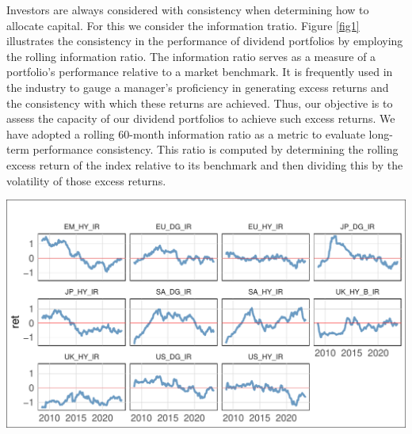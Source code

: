 \documentclass[10pt,preprint, authoryear]{elsarticle}
\let\origfigure\figure
\let\endorigfigure\endfigure
\renewenvironment{figure}[1][2] {
    \expandafter\origfigure\expandafter[H]
} {
    \endorigfigure
}
\numberwithin{equation}{section}
\numberwithin{figure}{section}
\numberwithin{table}{section}
\begin{document}
Investors are always considered with consistency when determining how to
allocate capital. For this we consider the information tratio. Figure
\ref{fig1} illustrates the consistency in the performance of dividend
portfolios by employing the rolling information ratio. The information
ratio serves as a measure of a portfolio's performance relative to a
market benchmark. It is frequently used in the industry to gauge a
manager's proficiency in generating excess returns and the consistency
with which these returns are achieved. Thus, our objective is to assess
the capacity of our dividend portfolios to achieve such excess returns.
We have adopted a rolling 60-month information ratio as a metric to
evaluate long-term performance consistency. This ratio is computed by
determining the rolling excess return of the index relative to its
benchmark and then dividing this by the volatility of those excess
returns.

\begin{figure}[H]

\includegraphics{Much_Ado_About_Dividends_files/figure-latex/unnamed-chunk-1-1} \hfill{}

\caption{Rolling 3 Year Returns \label{fig1}}\label{fig:unnamed-chunk-1}
\end{figure}
\end{document}
